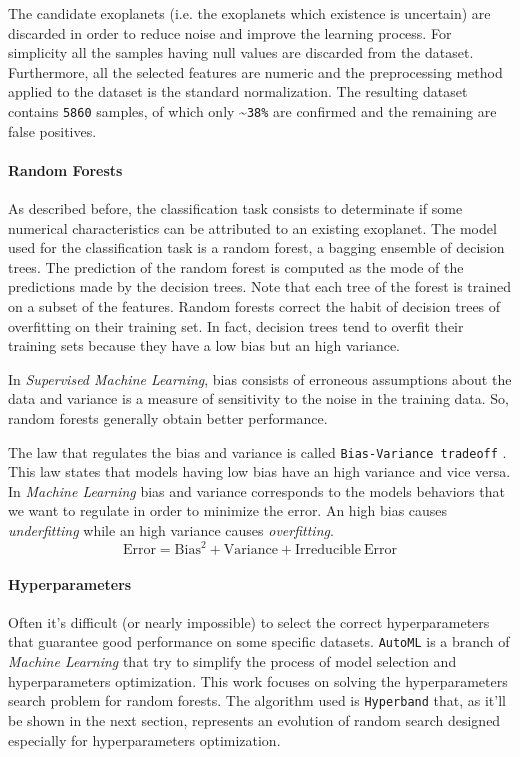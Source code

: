 \documentclass[11pt, a4paper]{article}
\begin{document}
    The candidate exoplanets (i.e. the exoplanets which existence is uncertain) are discarded in order to reduce noise and improve the learning process.
    For simplicity all the samples having null values are discarded from the dataset.
    Furthermore, all the selected features are numeric and the preprocessing method applied to the dataset is the standard normalization.
    The resulting dataset contains \texttt{5860} samples, of which only \textasciitilde \texttt{38\%} are confirmed and the remaining are false positives.

  \paragraph{Random Forests}
    As described before, the classification task consists to determinate if some numerical characteristics can be attributed to an existing exoplanet.
    The model used for the classification task is a random forest, a bagging ensemble of decision trees.
    The prediction of the random forest is computed as the mode of the predictions made by the decision trees.
    Note that each tree of the forest is trained on a subset of the features.
    Random forests correct the habit of decision trees of overfitting on their training set.
    In fact, decision trees tend to overfit their training sets because they have a low bias but an high variance.

    In \textit{Supervised Machine Learning}, bias consists of erroneous assumptions about the data and variance is a measure of sensitivity to the noise in the training data.
    So, random forests generally obtain better performance.

    The law that regulates the bias and variance is called \texttt{Bias-Variance tradeoff} \cite{biasvariance}.
    This law states that models having low bias have an high variance and vice versa.
    In \textit{Machine Learning} bias and variance corresponds to the models behaviors that we want to regulate in order to minimize the error.
    An high bias causes \textit{underfitting} while an high variance causes \textit{overfitting}.
      \[\mathrm{Error}=\mathrm{Bias}^{2}+\mathrm{Variance}+\mathrm{Irreducible\:Error}\]

  \paragraph{Hyperparameters}
    Often it's difficult (or nearly impossible) to select the correct hyperparameters that guarantee good performance on some specific datasets.
    \texttt{AutoML} is a branch of \textit{Machine Learning} that try to simplify the process of model selection and hyperparameters optimization.
    This work focuses on solving the hyperparameters search problem for random forests.
    The algorithm used is \texttt{Hyperband} that, as it'll be shown in the next section, represents an evolution of random search designed especially for hyperparameters optimization.
\end{document}
